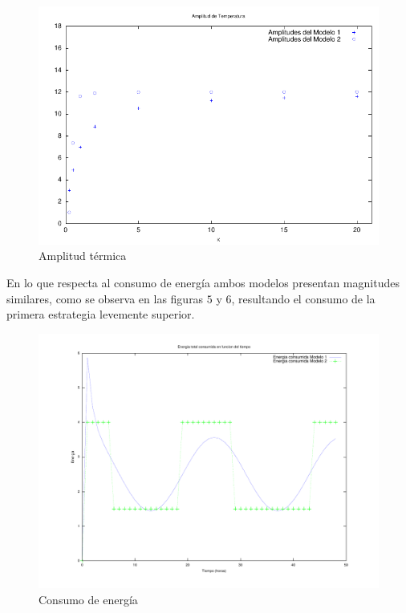 \documentclass{sig-alternate}
\begin{document}
\begin{figure}[hp]
\label{amplitud_termica}
\centering
\includegraphics[scale=1.05]{graficos/amplitudes}
\caption{Amplitud t\'{e}rmica}
\end{figure}

En lo que respecta al consumo de energ\'{i}a ambos modelos presentan magnitudes
similares, como se observa en las figuras $5$ y 
$6$, resultando el consumo de la primera estrategia
levemente superior.

\begin{figure}[hp]
\label{consumo_energia}
\centering
\includegraphics[scale=.8]{graficos/energia}
\caption{Consumo de energ\'{i}a}
\end{figure}
\end{document}
